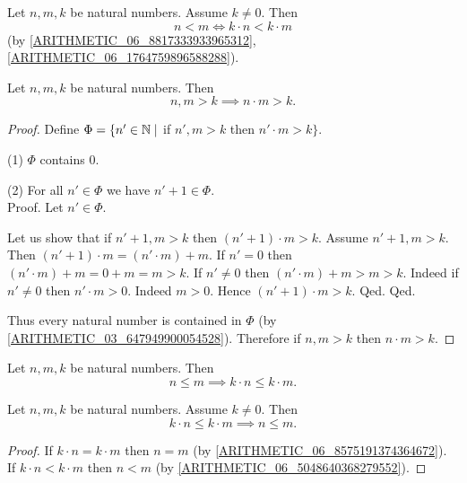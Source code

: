 \documentclass[10pt]{article}
\begin{document}
  \begin{forthel}
    \begin{corollary}
      Let $n, m, k$ be natural numbers.
      Assume $k \neq 0$.
      Then \[ n < m \iff k \cdot n < k \cdot m \]
      (by \cref{ARITHMETIC_06_8817333933965312}, \cref{ARITHMETIC_06_1764759896588288}).
    \end{corollary}
  \end{forthel}

  \begin{forthel}
    \begin{proposition}
      Let $n, m, k$ be natural numbers.
      Then \[ n, m > k \implies n \cdot m > k. \]
    \end{proposition}
    \begin{proof}
      Define $\Phi = \{ n' \in \mathbb{N} \mid$ if $n', m > k$ then $n' \cdot m > k \}$.

      (1) $\Phi$ contains $0$.

      (2) For all $n' \in \Phi$ we have $n' + 1 \in \Phi$. \\
      Proof.
        Let $n' \in \Phi$.

        Let us show that if $n' + 1, m > k$ then $(n' + 1) \cdot m > k$.
          Assume $n' + 1, m > k$.
          Then $(n' + 1) \cdot m = (n' \cdot m) + m$.
          If $n' = 0$ then
          $(n' \cdot m) + m
            = 0 + m
            = m
            > k$.
          If $n' \neq 0$ then
          $(n' \cdot m) + m
            > m
            > k$.
          Indeed if $n' \neq 0$ then $n' \cdot m > 0$.
          Indeed $m > 0$.
          Hence $(n' + 1) \cdot m > k$.
        Qed.
      Qed.

      Thus every natural number is contained in $\Phi$ (by \cref{ARITHMETIC_03_647949900054528}).
      Therefore if $n, m > k$ then $n \cdot m > k$.
    \end{proof}
  \end{forthel}

  \begin{forthel}
    \begin{corollary}
      Let $n, m, k$ be natural numbers.
      Then \[ n \leq m \implies k \cdot n \leq k \cdot m. \]
    \end{corollary}
  \end{forthel}

  \begin{forthel}
    \begin{corollary}
      Let $n, m, k$ be natural numbers.
      Assume $k \neq 0$.
      Then \[ k \cdot n \leq k \cdot m \implies n \leq m. \]
    \end{corollary}
    \begin{proof}
      If $k \cdot n = k \cdot m$ then $n = m$ (by \cref{ARITHMETIC_06_8575191374364672}).
      If $k \cdot n < k \cdot m$ then $n < m$ (by \cref{ARITHMETIC_06_5048640368279552}).
    \end{proof}
  \end{forthel}
\end{document}
